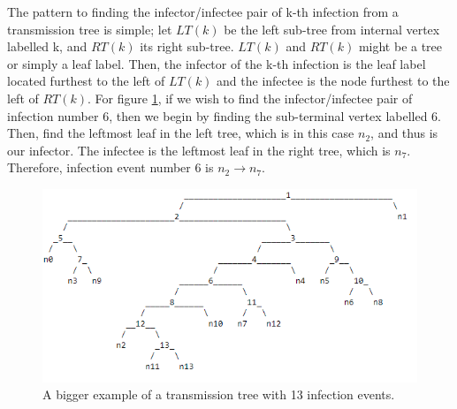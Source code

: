 \documentclass[12pt]{article} %
\numberwithin{equation}{section}
\begin{document}
The pattern to finding the infector/infectee pair of k-th infection from a transmission tree is simple; let $LT(k)$ be the left sub-tree from internal vertex labelled k, and $RT(k)$ its right sub-tree. $LT(k)$ and $RT(k)$ might be a tree or simply a leaf label. Then, the infector of the k-th infection is the leaf label located furthest to the left of $LT(k)$ and the infectee is the node furthest to the left of $RT(k)$. For figure \ref{bigtree}, if we wish to find the infector/infectee pair of infection number 6, then we begin by finding the sub-terminal vertex labelled 6. Then, find the leftmost leaf in the left tree, which is in this case $n_2$, and thus is our infector. The infectee is the leftmost leaf in the right tree, which is $n_7$. Therefore, infection event number 6 is $n_2 \rightarrow n_7$.
\begin{figure}[H]
    \centering
    \includegraphics[scale=0.7]{bigtree.png}   
    \caption{A bigger example of a transmission tree with 13 infection events.}
    \label{bigtree}
\end{figure}
\end{document}
